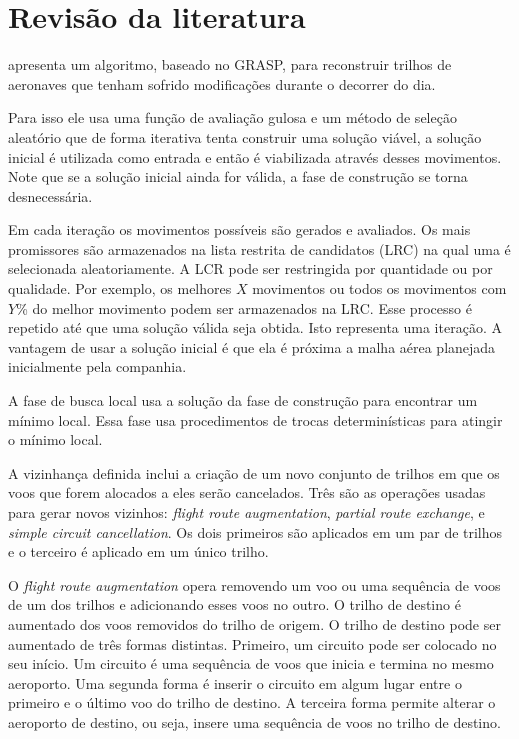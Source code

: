 \chapter{Revisão da literatura}
  
\cite{arguelo1997} apresenta um algoritmo, baseado no GRASP, para reconstruir
trilhos de aeronaves que tenham sofrido modificações durante o decorrer do dia.

Para isso ele usa uma função de avaliação gulosa e um método de seleção
aleatório que de forma iterativa tenta construir uma solução viável, a
solução inicial é utilizada como entrada e então é viabilizada através desses
movimentos. Note que se a solução inicial ainda for válida, a fase de construção
se torna desnecessária. 

Em cada iteração os movimentos possíveis são gerados e
avaliados. Os mais promissores são armazenados na lista restrita de candidatos
(LRC) na qual uma é selecionada aleatoriamente. A LCR pode ser restringida por
quantidade ou por qualidade. Por exemplo, os melhores $X$ movimentos ou todos os
movimentos com $Y$\% do melhor movimento podem ser armazenados na LRC.
Esse processo é repetido até que uma solução válida seja obtida. Isto
representa uma iteração. A vantagem de usar a solução inicial é que ela é
próxima a malha aérea planejada inicialmente pela companhia. 

A fase de busca local usa a solução da fase de construção para encontrar um
mínimo local. Essa fase usa procedimentos de trocas determinísticas para
atingir o mínimo local. 

A vizinhança definida inclui a criação de um novo  conjunto de trilhos em que os
voos que forem alocados a eles serão cancelados. Três são as operações usadas
para gerar novos vizinhos: \textit{flight route augmentation}, \textit{partial
route exchange}, e \textit{simple circuit cancellation}. Os dois primeiros são
aplicados em um par de trilhos e o terceiro é aplicado em um único trilho. 

O \textit{flight route augmentation} opera removendo um voo ou uma sequência de
voos de um dos trilhos e adicionando esses voos no outro. O trilho de destino é
aumentado dos voos removidos do trilho de origem. O trilho de destino pode ser
aumentado de três formas distintas. Primeiro, um circuito pode ser colocado no
seu início. Um circuito é uma sequência de voos que inicia e termina no mesmo
aeroporto. Uma segunda forma é inserir o circuito em algum lugar entre o
primeiro e o último voo do trilho de destino. A terceira forma permite alterar
o aeroporto de destino, ou seja, insere uma sequência de voos no trilho de destino. 

